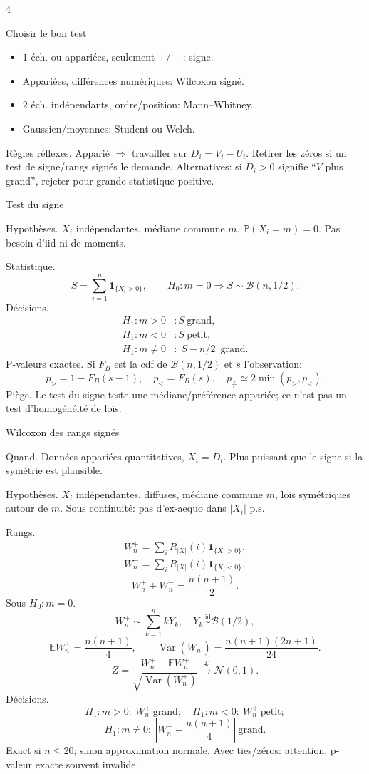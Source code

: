 \documentclass[10pt]{article}
\newcommand{\ind}{\mathbf 1}
\newcommand{\E}{\mathbb E}
\newcommand{\V}{\operatorname{Var}}
\newcommand{\Prob}{\mathbb P}
\newcommand{\iid}{\stackrel{\mathrm{iid}}{\sim}}
\newcommand{\dto}{\xrightarrow{\mathcal L}}
\newcommand{\boxhead}[1]{%
  \vspace{2pt}\par\noindent #1\par\vspace{1pt}}
\newcommand{\tinytitle}[1]{#1.}
\begin{document}
\fontsize{5.9}{6.5}\selectfont

\begin{multicols*}{4}

\boxhead{Choisir le bon test}
\begin{itemize}
\item \(1\) éch. ou appariées, seulement \(+/-\): signe.
\item Appariées, différences numériques: Wilcoxon signé.
\item \(2\) éch. indépendants, ordre/position: Mann--Whitney.
\item Gaussien/moyennes: Student ou Welch.
\end{itemize}

\tinytitle{Règles réflexes}
Apparié \(\Rightarrow\) travailler sur \(D_i=V_i-U_i\). Retirer les zéros si un test de signe/rangs signés le demande. Alternatives: si \(D_i>0\) signifie ``\(V\) plus grand'', rejeter pour grande statistique positive.

\boxhead{Test du signe}
\tinytitle{Hypothèses} \(X_i\) indépendantes, médiane commune \(m\), \(\Prob(X_i=m)=0\). Pas besoin d'iid ni de moments.

\tinytitle{Statistique}
\[
S=\sum_{i=1}^n\ind_{\{X_i>0\}},\qquad
H_0:m=0\Rightarrow S\sim\mathcal B(n,1/2).
\]
\tinytitle{Décisions}
\[
\begin{array}{ll}
H_1:m>0 &: S\ \text{grand},\\
H_1:m<0 &: S\ \text{petit},\\
H_1:m\ne0 &: |S-n/2|\ \text{grand}.
\end{array}
\]
\tinytitle{P-valeurs exactes} Si \(F_B\) est la cdf de \(\mathcal B(n,1/2)\) et \(s\) l'observation:
\[
p_{>}=1-F_B(s-1),\quad p_{<}=F_B(s),\quad
p_{\ne}\simeq 2\min(p_{>},p_{<}).
\]
\tinytitle{Piège} Le test du signe teste une médiane/préférence appariée; ce n'est pas un test d'homogénéité de lois.

\boxhead{Wilcoxon des rangs signés}
\tinytitle{Quand} Données appariées quantitatives, \(X_i=D_i\). Plus puissant que le signe si la symétrie est plausible.

\tinytitle{Hypothèses} \(X_i\) indépendantes, diffuses, médiane commune \(m\), lois symétriques autour de \(m\). Sous continuité: pas d'ex-aequo dans \(|X_i|\) p.s.

\tinytitle{Rangs}
\[
\begin{gathered}
W_n^+=\sum_i R_{|X|}(i)\ind_{\{X_i>0\}},\\
W_n^-=\sum_i R_{|X|}(i)\ind_{\{X_i<0\}},
\end{gathered}
\]
\[
W_n^++W_n^-=\frac{n(n+1)}2.
\]
\tinytitle{Sous \(H_0:m=0\)}
\[
W_n^+\sim\sum_{k=1}^n kY_k,\quad Y_k\iid\mathcal B(1/2),
\]
\[
\E W_n^+=\frac{n(n+1)}4,\qquad
\V(W_n^+)=\frac{n(n+1)(2n+1)}{24}.
\]
\[
Z=\frac{W_n^+-\E W_n^+}{\sqrt{\V(W_n^+)}}\dto\mathcal N(0,1).
\]
\tinytitle{Décisions}
\[
H_1:m>0:\ W_n^+\ \text{grand};\quad
H_1:m<0:\ W_n^+\ \text{petit};
\]
\[
H_1:m\ne0:\ \left|W_n^+-\frac{n(n+1)}4\right|\ \text{grand}.
\]
Exact si \(n\le20\); sinon approximation normale. Avec ties/zéros: attention, p-valeur exacte souvent invalide.


\end{multicols*}
\end{document}
